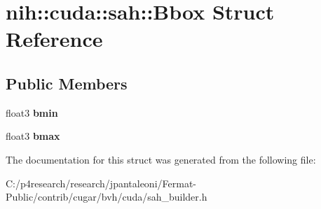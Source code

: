 \hypertarget{structnih_1_1cuda_1_1sah_1_1_bbox}{}\section{nih\+:\+:cuda\+:\+:sah\+:\+:Bbox Struct Reference}
\label{structnih_1_1cuda_1_1sah_1_1_bbox}
\subsection*{Public Members}
\begin{DoxyCompactItemize}
\item 
\mbox{\label{structnih_1_1cuda_1_1sah_1_1_bbox_a8c21e7dd978c870d9d9d7b6b139d59a4}} 
float3 {\bfseries bmin}
\item 
\mbox{\label{structnih_1_1cuda_1_1sah_1_1_bbox_a991ba9a48ad4c6e02dfb92731ede9111}} 
float3 {\bfseries bmax}
\end{DoxyCompactItemize}


The documentation for this struct was generated from the following file\+:\begin{DoxyCompactItemize}
\item 
C\+:/p4research/research/jpantaleoni/\+Fermat-\/\+Public/contrib/cugar/bvh/cuda/sah\+\_\+builder.\+h\end{DoxyCompactItemize}
